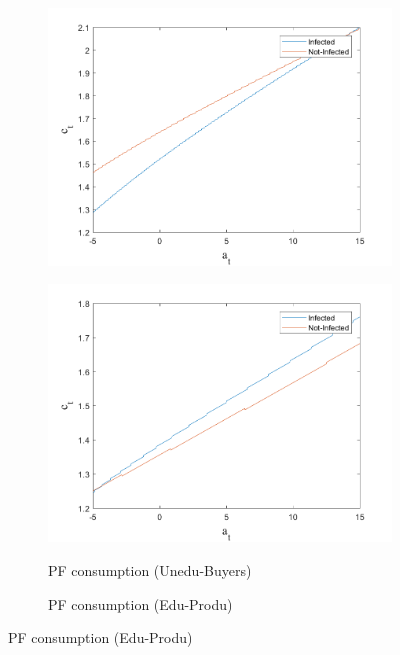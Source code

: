 \begin{figure}[H]
\begin{subfigure}{0.5\textwidth}
   \includegraphics[width=\linewidth,height = 0.22\textheight]{figures/art/FIG6.png}
    \label{fig_dert}
\end{subfigure}
\hspace*{\fill}
\begin{subfigure}{0.5\textwidth}\caption{PF consumption (Unedu-Buyers)}
   \includegraphics[width=\linewidth,height = 0.22\textheight]{figures/art/FIG5.png}
    \label{fig:x_b}
\end{subfigure}
\bigskip
\begin{subfigure}{0.5\textwidth}\caption{PF consumption (Edu-Produ)}

\end{subfigure}
\end{figure}
